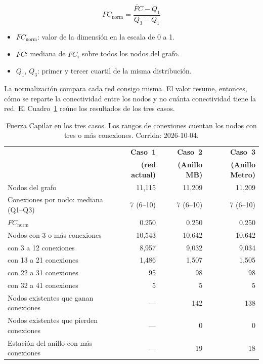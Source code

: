 \begin{equation}
    FC_{\text{norm}} = \frac{\widetilde{FC} - Q_1}{Q_3 - Q_1}
    \label{eq:anillo-fc-norm}
\end{equation}

\begin{itemize}
    \item $FC_{\text{norm}}$: valor de la dimensión en la escala de 0 a 1.
    \item $\widetilde{FC}$: mediana de $FC_i$ sobre todos los nodos del grafo.
    \item $Q_1$, $Q_3$: primer y tercer cuartil de la misma distribución.
\end{itemize}

La normalización compara cada red consigo misma. El valor resume, entonces,
cómo se reparte la conectividad entre los nodos y no cuánta conectividad tiene
la red. El Cuadro~\ref{tab:anillo-fc} reúne los resultados de los tres casos.

\begin{table}[H]
    \centering
    \caption[Fuerza Capilar en los tres casos]{%
    Fuerza Capilar en los tres casos. Los rangos de conexiones cuentan los
    nodos con tres o más conexiones. Corrida: 2026-10-04.}
    \label{tab:anillo-fc}
    \small
    \begin{tabular}{|p{6.0cm}|r|r|r|}
        \hline
        & \textbf{Caso~1} & \textbf{Caso~2} & \textbf{Caso~3} \\
        & \textbf{(red actual)} & \textbf{(Anillo MB)} &
          \textbf{(Anillo Metro)} \\
        \hline
        Nodos del grafo                         & 11,115 & 11,209 & 11,209 \\
        Conexiones por nodo: mediana (Q1--Q3)   & 7 (6--10) & 7 (6--10) &
            7 (6--10) \\
        $FC_{\text{norm}}$                      & 0.250  & 0.250  & 0.250 \\
        \hline
        Nodos con 3 o más conexiones            & 10,543 & 10,642 & 10,642 \\
        \quad con 3 a 12 conexiones             & 8,957  & 9,032  & 9,034 \\
        \quad con 13 a 21 conexiones            & 1,486  & 1,507  & 1,505 \\
        \quad con 22 a 31 conexiones            & 95     & 98     & 98 \\
        \quad con 32 a 41 conexiones            & 5      & 5      & 5 \\
        \hline
        Nodos existentes que ganan conexiones   & ---    & 142    & 138 \\
        Nodos existentes que pierden conexiones & ---    & 0      & 0 \\
        Estación del anillo con más conexiones  & ---    & 19     & 18 \\
        \hline
    \end{tabular}
\end{table}

